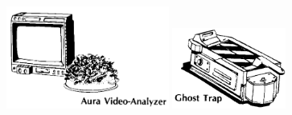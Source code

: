 \begin{frame}[b]
{\begin{center}
\includegraphics[width=0.4\textwidth]{./images/aura-analyseur.png} \hspace{0.5cm}  \includegraphics[width=0.28\textwidth]{./images/ghost-trap.png}\textsl{}
\end{center}

}
\end{frame}
